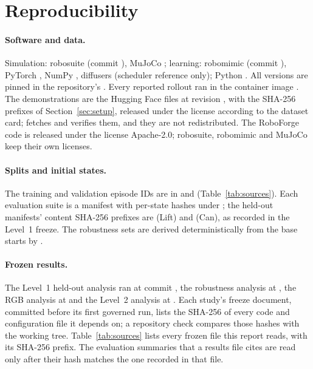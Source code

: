 \section{Reproducibility}
\label{app:repro}

\paragraph{Software and data.} Simulation: robosuite  (commit
\texttt{}), MuJoCo ; learning: robomimic
 (commit \texttt{}), PyTorch , NumPy
, diffusers  (scheduler reference only); Python
. All versions are pinned in the repository's . Every reported
rollout ran in the container image . The demonstrations are the
Hugging Face  files at revision , with
the SHA-256 prefixes of Section~\ref{sec:setup}, released under the  license
according to the dataset card;  fetches and verifies them, and they are
not redistributed. The RoboForge code is released under the license Apache-2.0; robosuite,
robomimic and MuJoCo keep their own licenses.

\paragraph{Splits and initial states.} The training and validation episode IDs are in
 and  (Table~\ref{tab:sources}).
Each evaluation suite is a manifest with per-state hashes under
; the held-out manifests' content SHA-256 prefixes are
\texttt{} (Lift) and \texttt{} (Can), as
recorded in the Level~1 freeze. The robustness sets are derived deterministically from the
base starts by .

\paragraph{Frozen results.} The Level~1 held-out analysis ran at commit \texttt{},
the robustness analysis at \texttt{}, the RGB analysis at \texttt{} and the
Level~2 analysis at \texttt{}. Each study's freeze document, committed before its
first governed run, lists the SHA-256 of every code and configuration file it depends on; a
repository check compares those hashes with the working tree. Table~\ref{tab:sources} lists
every frozen file this report reads, with its SHA-256 prefix. The evaluation summaries that a
results file cites are read only after their hash matches the one recorded in that file.

